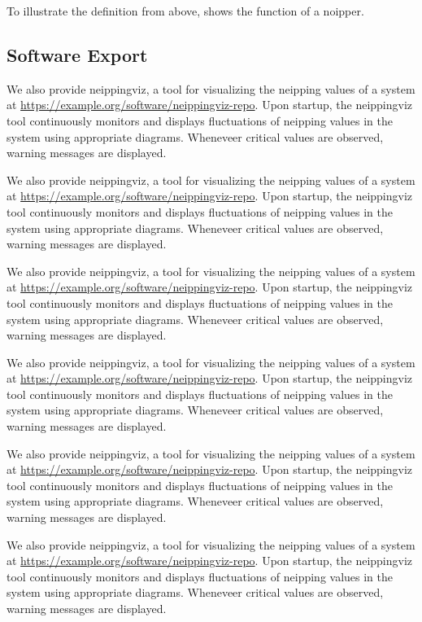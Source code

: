                 
To illustrate the definition from above,  shows the function of a noipper.

\subsection{Software Export}

We also provide neippingviz, a tool for visualizing the neipping values of a system at \url{https://example.org/software/neippingviz-repo}. Upon startup, the neippingviz tool continuously monitors and displays fluctuations of neipping values in the system using appropriate diagrams. Wheneveer critical values are observed, warning messages are displayed.

We also provide neippingviz, a tool for visualizing the neipping values of a system at \url{https://example.org/software/neippingviz-repo}. Upon startup, the neippingviz tool continuously monitors and displays fluctuations of neipping values in the system using appropriate diagrams. Wheneveer critical values are observed, warning messages are displayed.

We also provide neippingviz, a tool for visualizing the neipping values of a system at \url{https://example.org/software/neippingviz-repo}. Upon startup, the neippingviz tool continuously monitors and displays fluctuations of neipping values in the system using appropriate diagrams. Wheneveer critical values are observed, warning messages are displayed.

We also provide neippingviz, a tool for visualizing the neipping values of a system at \url{https://example.org/software/neippingviz-repo}. Upon startup, the neippingviz tool continuously monitors and displays fluctuations of neipping values in the system using appropriate diagrams. Wheneveer critical values are observed, warning messages are displayed.

We also provide neippingviz, a tool for visualizing the neipping values of a system at \url{https://example.org/software/neippingviz-repo}. Upon startup, the neippingviz tool continuously monitors and displays fluctuations of neipping values in the system using appropriate diagrams. Wheneveer critical values are observed, warning messages are displayed.

We also provide neippingviz, a tool for visualizing the neipping values of a system at \url{https://example.org/software/neippingviz-repo}. Upon startup, the neippingviz tool continuously monitors and displays fluctuations of neipping values in the system using appropriate diagrams. Wheneveer critical values are observed, warning messages are displayed.

